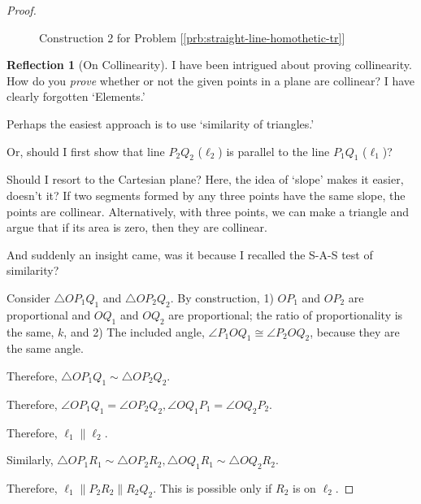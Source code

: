 \documentclass[11pt]{article}
\theoremstyle{definition}
\theoremstyle{plain}
\theoremstyle{problemstyle}
\theoremstyle{remark}
\theoremstyle{definition}
\newtheorem{reflection}{Reflection}
\begin{document}
\begin{proof}
\begin{figure}[H]
    \caption{Construction 2 for Problem [\ref{prb:straight-line-homothetic-tr}]}
    \label{fig:straight-line-homothetic-tr-2}
\end{figure}
\begin{reflection}[On Collinearity]
    I have been intrigued about proving collinearity. How do you \emph{prove} whether or not the given points in a plane are collinear? I have clearly forgotten `Elements.'

    Perhaps the easiest approach is to use `similarity of triangles.'

    Or, should I first show that line $P_2Q_2$ ($\ell_2$) is parallel to the line $P_1Q_1$ ($\ell_1$)?

    Should I resort to the Cartesian plane? Here, the idea of `slope' makes it easier, doesn't it? If two segments formed by any three points have the same slope, the points are collinear. Alternatively, with three points, we can make a triangle and argue that if its area is zero, then they are collinear.

    And suddenly an insight came, was it because I recalled the S-A-S test of similarity?
\end{reflection}

Consider $\triangle OP_1Q_1$ and $\triangle OP_2Q_2$. By construction, 1) $OP_1$ and $OP_2$ are proportional and $OQ_1$ and $OQ_2$ are proportional; the ratio of proportionality is the same, $k$, and 2) The included angle, $\angle P_1OQ_1\cong\angle P_2OQ_2$, because they are the same angle.

Therefore, $\triangle OP_1Q_1\sim\triangle OP_2Q_2$.

Therefore, $\angle OP_1Q_1=\angle OP_2Q_2, \angle OQ_1P_1=\angle OQ_2P_2$.

Therefore, $\ell_1\parallel\ell_2$.

Similarly, $\triangle OP_1R_1\sim\triangle OP_2R_2, \triangle OQ_1R_1\sim\triangle OQ_2R_2$.

Therefore, $\ell_1\parallel P_2R_2\parallel R_2Q_2$. This is possible only if $R_2$ is on $\ell_2$.
\end{proof}
\end{document}
